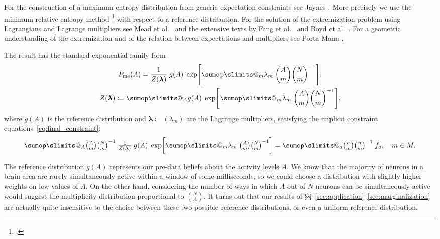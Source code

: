 \documentclass[\ifafour a4paper,12pt,\else a5paper,10pt,\fi%
onecolumn,oneside,article,%
british%
]{memoir}
\makeatletter
\theoremstyle{remark}
\theoremstyle{innote}
\def\sum{\DOTSI\sumop\slimits@}
\newcommand*{\citep}{\footcites}
\newcommand*{\citey}{\parencites*}
\newcommand*{\defd}{\coloneqq}
\renewcommand*{\|}{\nonscript\,\vert\nonscript\;\mathopen{}}
\newcommand*{\sect}{\S}%
\newcommand*{\sects}{\S\S}%
\newcommand*{\chap}{ch.}%
\newcommand*{\etal}{{et al.}}
\newcommand*{\yAv}{A}
\newcommand*{\yav}{a}
\newcommand*{\yff}{f}
\newcommand*{\ya}{\yav}%
\newcommand*{\yA}{\yAv}%
\newcommand*{\yll}{\bm{\lambda}}
\newcommand*{\yl}{\lambda}
\newcommand*{\px}{P_{\text{me}}}
\makeatother
\begin{document}
\bigskip

For the construction of a maximum-entropy distribution from generic
expectation constraints see Jaynes
\citey{jaynes1963}[\chap~11]{jaynes1994_r2003}. More precisely we use the
minimum relative-entropy method
\citep{hobsonetal1973,csiszar1985}[\sect~5.2.2]{sivia1996_r2006} with
respect to a reference distribution. For the solution of the extremization
problem using Lagrangians and Lagrange multipliers see Mead \etal\
\citey{meadetal1984} and the extensive texts by Fang \etal\
\citey{fangetal1997} and Boyd \etal\ \citey{boydetal2004_r2009}. For a
geometric understanding of the extremization and of the relation between
expectations and multipliers see Porta Mana \citey{portamana2017b}.

The result has the standard exponential-family form
\begin{equation}
  \label{eq:app_maxent_pop}
  \begin{gathered}
  \px(\yA)  = \frac{1}{Z(\yll)}\;
  g(\yA)\;
  \exp\Biggl[\sum_{m}\yl_{m}\;
  \binom{\yA}{m}\binom{N}{m}^{-1}
  \Biggr],
  \\
  Z(\yll)\defd \sum_{\yA}g(\yA)\;
  \exp\Biggl[\sum_{m}\yl_{m}\;
  \binom{\yA}{m}\binom{N}{m}^{-1}
  \Biggr],
\end{gathered}
\end{equation}
where $g(\yA)$ is the reference distribution and $\yll\defd (\yl_{m})$ are
the Lagrange multipliers, satisfying the implicit
constraint equations~\eqref{eq:final_constraint}:
\begin{equation}
  \label{eq:constraint_eq_lambda}
  \sum_{\yA}
  \tbinom{\yA}{m}\tbinom{N}{m}^{-1}\;
  \tfrac{1}{Z(\yll)}\;
  g(\yA)\;
  \exp\biggl[\sum_{m}\yl_{m}\;
  \tbinom{\yA}{m}\tbinom{N}{m}^{-1}
  \biggr]
=
  \sum_{\ya}
  \tbinom{\ya}{m} \tbinom{n}{m}^{-1} \; \yff_{\ya},\quad
  m\in M.
\end{equation}

The reference distribution $g(\yA)$ represents our pre-data beliefs about
the activity levels $\yA$. We know that the majority of neurons in a brain
area are rarely simultaneously active within a window of some milliseconds,
so we could choose a distribution with slightly higher weights on low
values of $\yA$. On the other hand, considering the number of ways in which
$\yA$ out of $N$ neurons can be simultaneously active would suggest the
multiplicity distribution proportional to $\binom{N}{\yA}$. It turns out
that our results of \sects~\ref{sec:application}--\ref{sec:marginalization}
are actually quite insensitive to the choice between these two possible
reference distributions, or even a uniform reference distribution.
\end{document}
